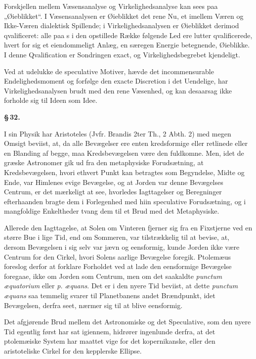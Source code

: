 \documentclass[12pt]{book}
\newcommand{\opage}[1]{\marginnote{\footnotesize\textit{[#1]}}}
\begin{document}
Forskjellen mellem Væsensanalyse og Virkelighedsanalyse kan sees paa
„Øieblikket“. I Væsensanalysen er Øieblikket det rene Nu, et imellem Væren og
Ikke-Væren dialektisk Spillende; i Virkelighedsanalysen er Øieblikket derimod
qvalificeret: alle paa s i den opstillede Række følgende Led ere lutter
qvalificerede, hvert for sig et eiendommeligt Anlæg, en særegen Energie
betegnende, Øieblikke. I denne Qvalification er Sondringen exact, og
Virkelighedsbegrebet kjendeligt.

Ved at udelukke de speculative Motiver, hævde det incommensurable
Endelighedsmoment og forfølge den exacte Discretion i det Uendelige, har
Virkelighedsanalysen brudt med den rene Væsenhed, og kan desaarsag ikke forholde
sig til Ideen som Idee.

\begin{center}{\bfseries \S\,32.}\end{center}

I sin Physik har Aristoteles (Jvfr. Brandis 2ter Th., 2 Abth. 2) med megen
Omsigt beviist, at, da alle Bevægelser ere enten kredsformige eller retlinede
eller en Blanding af begge, maa Kredsbevægelsen være den fuldkomne. Men, idet de
græske Astronomer gik ud fra den metaphysiske Forudsætning, at Kredsbevægelsen,
hvori ethvert Punkt kan betragtes som Begyndelse, Midte og Ende, var Himlenes
evige Bevægelse, og at Jorden var denne Bevægelses Centrum, er det mærkeligt at
see, hvorledes Iagttagelser og Beregninger efterhaanden bragte dem i Forlegenhed
med hiin speculative Forudsætning, og i mangfoldige Enkeltheder tvang dem til et
Brud med det Metaphysiske.

Allerede den Iagttagelse, at Solen om Vinteren fjerner sig fra en Fixstjerne ved
en større Bue i lige Tid, end om Sommeren, var tilstrækkelig til at bevise, at,
dersom Bevægelsen i sig selv var jævn og eensformig, kunde Jorden
\opage{168} ikke være Centrum for den Cirkel, hvori Solens aarlige Bevægelse foregik.
Ptolemæus foreslog derfor at forklare Forholdet ved at lade den eensformige
Bevægelse foregaae, ikke om Jorden som Centrum, men om det saakaldte
\textit{punctum æquatorium} eller \textit{p. æquans}. Det er i den nyere Tid
beviist, at dette \textit{punctum æquans} saa temmelig svarer til Planetbanens
andet Brændpunkt, idet Bevægelsen, derfra seet, nærmer sig til at blive
eensformig.

Det afgjørende Brud mellem det Astronomiske og det Speculative, som den nyere
Tid egentlig først har sat igiennem, hidrører ingenlunde derfra, at det
ptolemæiske System har maattet vige for det kopernikanske, eller den
aristoteliske Cirkel for den kepplerske Ellipse.
\end{document}
